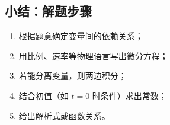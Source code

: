 \subsection*{小结：解题步骤}
\begin{enumerate}
    \item 根据题意确定变量间的依赖关系；
    \item 用比例、速率等物理语言写出微分方程；
    \item 若能分离变量，则两边积分；
    \item 结合初值（如 $t=0$ 时条件）求出常数；
    \item 给出解析式或函数关系。
\end{enumerate}